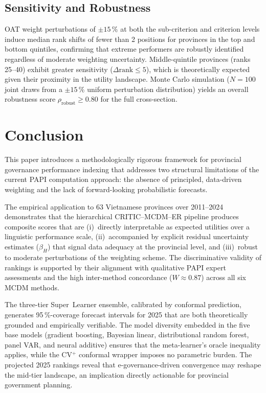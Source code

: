 \documentclass[12pt, a4paper]{article}
\begin{document}
\subsection{Sensitivity and Robustness}

OAT weight perturbations of $\pm 15\,\%$ at both the sub-criterion and criterion
levels induce median rank shifts of fewer than 2 positions for provinces in the
top and bottom quintiles, confirming that extreme performers are robustly
identified regardless of moderate weighting uncertainty. Middle-quintile
provinces (ranks 25--40) exhibit greater sensitivity ($\Delta\text{rank} \le 5$),
which is theoretically expected given their proximity in the utility landscape.
Monte Carlo simulation ($N = 100$ joint draws from a $\pm 15\,\%$ uniform
perturbation distribution) yields an overall robustness score
$\rho_{\text{robust}} \ge 0.80$ for the full cross-section.

\section{Conclusion}

This paper introduces a methodologically rigorous framework for provincial
governance performance indexing that addresses two structural limitations of
the current PAPI computation approach: the absence of principled, data-driven
weighting and the lack of forward-looking probabilistic forecasts.

The empirical application to 63 Vietnamese provinces over 2011--2024 demonstrates
that the hierarchical CRITIC--MCDM--ER pipeline produces composite scores that
are (i)~directly interpretable as expected utilities over a linguistic performance
scale, (ii)~accompanied by explicit residual uncertainty estimates ($\hat{\beta}_H$)
that signal data adequacy at the provincial level, and (iii)~robust to moderate
perturbations of the weighting scheme. The discriminative validity of rankings is
supported by their alignment with qualitative PAPI expert assessments and the high
inter-method concordance ($W \approx 0.87$) across all six MCDM methods.

The three-tier Super~Learner ensemble, calibrated by conformal prediction, generates
95\,\%-coverage forecast intervals for 2025 that are both theoretically grounded
and empirically verifiable. The model diversity embedded in the five base models
(gradient boosting, Bayesian linear, distributional random forest, panel VAR, and
neural additive) ensures that the meta-learner's oracle inequality applies, while
the CV$^+$ conformal wrapper imposes no parametric burden. The projected 2025
rankings reveal that e-governance-driven convergence may reshape the mid-tier
landscape, an implication directly actionable for provincial government planning.
\end{document}
